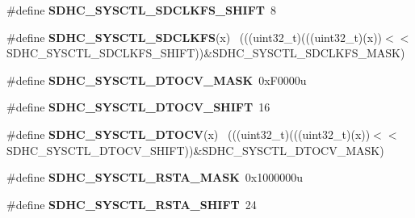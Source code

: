 \begin{DoxyCompactItemize}
\item 
\hypertarget{group___s_d_h_c___register___masks_ga773898be0f7bf2952f8d99428f200f69}{}\#define {\bfseries S\+D\+H\+C\+\_\+\+S\+Y\+S\+C\+T\+L\+\_\+\+S\+D\+C\+L\+K\+F\+S\+\_\+\+S\+H\+I\+F\+T}~8\label{group___s_d_h_c___register___masks_ga773898be0f7bf2952f8d99428f200f69}

\item 
\hypertarget{group___s_d_h_c___register___masks_gafca13ee13ea4cf6110df1b20b815dd74}{}\#define {\bfseries S\+D\+H\+C\+\_\+\+S\+Y\+S\+C\+T\+L\+\_\+\+S\+D\+C\+L\+K\+F\+S}(x)                                  ~(((uint32\+\_\+t)(((uint32\+\_\+t)(x))$<$$<$S\+D\+H\+C\+\_\+\+S\+Y\+S\+C\+T\+L\+\_\+\+S\+D\+C\+L\+K\+F\+S\+\_\+\+S\+H\+I\+F\+T))\&S\+D\+H\+C\+\_\+\+S\+Y\+S\+C\+T\+L\+\_\+\+S\+D\+C\+L\+K\+F\+S\+\_\+\+M\+A\+S\+K)\label{group___s_d_h_c___register___masks_gafca13ee13ea4cf6110df1b20b815dd74}

\item 
\hypertarget{group___s_d_h_c___register___masks_gaa17354539833a6acfd128354f34d2e57}{}\#define {\bfseries S\+D\+H\+C\+\_\+\+S\+Y\+S\+C\+T\+L\+\_\+\+D\+T\+O\+C\+V\+\_\+\+M\+A\+S\+K}~0x\+F0000u\label{group___s_d_h_c___register___masks_gaa17354539833a6acfd128354f34d2e57}

\item 
\hypertarget{group___s_d_h_c___register___masks_ga333315b6c4564242ddc38a7ba077b5ae}{}\#define {\bfseries S\+D\+H\+C\+\_\+\+S\+Y\+S\+C\+T\+L\+\_\+\+D\+T\+O\+C\+V\+\_\+\+S\+H\+I\+F\+T}~16\label{group___s_d_h_c___register___masks_ga333315b6c4564242ddc38a7ba077b5ae}

\item 
\hypertarget{group___s_d_h_c___register___masks_gafad8e9487e61811b4e2e3cc4f8003cb5}{}\#define {\bfseries S\+D\+H\+C\+\_\+\+S\+Y\+S\+C\+T\+L\+\_\+\+D\+T\+O\+C\+V}(x)                                      ~(((uint32\+\_\+t)(((uint32\+\_\+t)(x))$<$$<$S\+D\+H\+C\+\_\+\+S\+Y\+S\+C\+T\+L\+\_\+\+D\+T\+O\+C\+V\+\_\+\+S\+H\+I\+F\+T))\&S\+D\+H\+C\+\_\+\+S\+Y\+S\+C\+T\+L\+\_\+\+D\+T\+O\+C\+V\+\_\+\+M\+A\+S\+K)\label{group___s_d_h_c___register___masks_gafad8e9487e61811b4e2e3cc4f8003cb5}

\item 
\hypertarget{group___s_d_h_c___register___masks_gab4c8c72837143c46d7c36342c494b4ad}{}\#define {\bfseries S\+D\+H\+C\+\_\+\+S\+Y\+S\+C\+T\+L\+\_\+\+R\+S\+T\+A\+\_\+\+M\+A\+S\+K}~0x1000000u\label{group___s_d_h_c___register___masks_gab4c8c72837143c46d7c36342c494b4ad}

\item 
\hypertarget{group___s_d_h_c___register___masks_gaa5f5e5f66dea7902c53a8cb01ec27fbb}{}\#define {\bfseries S\+D\+H\+C\+\_\+\+S\+Y\+S\+C\+T\+L\+\_\+\+R\+S\+T\+A\+\_\+\+S\+H\+I\+F\+T}~24\label{group___s_d_h_c___register___masks_gaa5f5e5f66dea7902c53a8cb01ec27fbb}


\end{DoxyCompactItemize}
